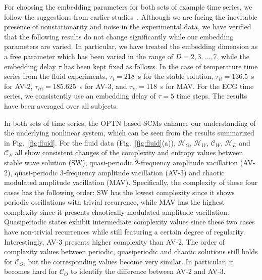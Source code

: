 \documentclass[12pt,aip,cha,reprint,nofootinbib]{revtex4-1}
\begin{document}
For choosing the embedding parameters for both sets of example time series, we follow the suggestions from earlier studies~\cite{ZouEPJST2008,smallCSF2002}. Although we are facing the inevitable presence of nonstationarity and noise in the experimental data, we have verified that the following results do not change significantly while our embedding parameters are varied. In particular, we have treated the embedding dimension as a free parameter which has been varied in the range of $D = 2, 3, \ldots, 7$, while the embedding delay $\tau$ has been kept fixed as follows. In the case of temperature time series from the fluid experiments, $\tau_{i} = 218$~s for the stable solution, $\tau_{ii} = 136.5$~s  for AV-2, $\tau_{iii} = 185.625$~s for AV-3, and $\tau_{iv} = 118$~s for MAV. For the ECG time series, we consistently use an embedding delay of $\tau = 5$ time steps. The results have been averaged over all subjects. 

In both sets of time series, the OPTN based SCMs enhance our understanding of the underlying nonlinear system, which can be seen from the results summarized in Fig.~\ref{fig:fluid}. For the fluid data (Fig.~\ref{fig:fluid}(a)), $\mathcal{H}_O$, $\mathcal{H}_W$, $\mathcal{C}_W$, $\mathcal{H}_E$ and $\mathcal{C}_E$ all show consistent changes of the complexity and entropy values between stable wave solution (SW), quasi-periodic 2-frequency amplitude vacillation (AV-2), quasi-periodic 3-frequency amplitude vacillation (AV-3) and chaotic modulated amplitude vacillation (MAV). Specifically, the complexity of these four cases has the following order: SW has the lowest complexity since it shows periodic oscillations with trivial recurrence, while MAV has the highest complexity since it presents chaotically modulated amplitude vacillation. Quasiperiodic states exhibit intermediate complexity values since these two cases have non-trivial recurrences while still featuring a certain degree of regularity. Interestingly, AV-3 presents higher complexity than AV-2. The order of complexity values between periodic, quasiperiodic and chaotic solutions still holds for $\mathcal{C}_O$, but the corresponding values become very similar. In particular, it becomes hard for $\mathcal{C}_O$ to identify the difference between AV-2 and AV-3. 
\end{document}
